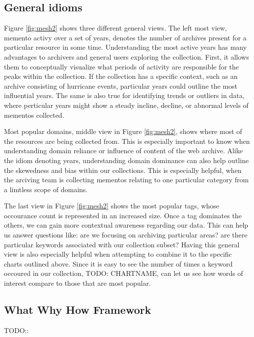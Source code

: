 \documentclass[10pt,journal,compsoc]{IEEEtran}
\begin{document}
\subsection{General idioms}
Figure \ref{fig:mesh2} shows three different general views. The left most view, memento activy over a set of years, denotes the number of archives present for a particular resource in some time. Understanding the most active years has many advantages to archivers and general users exploring the collection. First, it allows them to conceptually visualize what periods of activity are responsible for the peaks within the collection. If the collection has a specific context, such as an archive consisting of hurricane events, particular years could outline the most influential years. The same is also true for identifying trends or outliers in data, where perticular years might show a steady incline, decline, or abnormal levels of mementos collected. \par

Most popular domains, middle view in Figure \ref{fig:mesh2}, shows where most of the resources are being collected from. This is especially important to know when understanding domain reliance or influence of content of the web archive. Alike the idiom denoting years, understanding domain dominance can also help outline the skewedness and bias within our collections. This is especially helpful, when the arciving team is collecting mementos relating to one particular category from a limtless scope of domains. \par

The last view in Figure \ref{fig:mesh2} shows the most popular tags, whose occourance count is represented in an increased size. Once a tag dominates the others, we can gain more contextual awareness regarding our data. This can help us answer questions like: are we focusing on archiving particular areas? are there particular keywords associated with our collection subset? Having this general view is also especially helpful when attempting to combine it to the specific charts outlined above. Since it is easy to see the number of times a keyword occoured in our collection, TODO: CHARTNAME, can let us see how words of interest compare to those that are most popular. \par

\subsection{What Why How Framework}
TODO::
\end{document}
